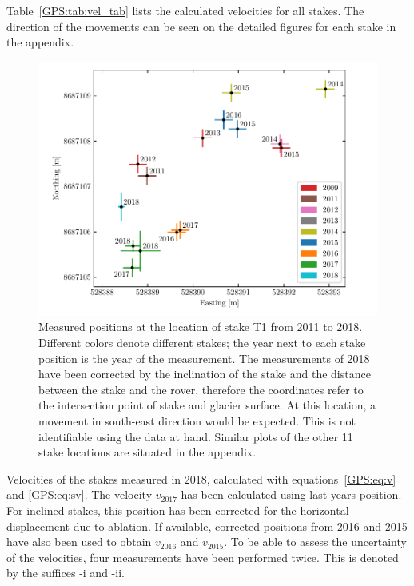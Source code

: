 Table~\ref{GPS:tab:vel_tab} lists the calculated velocities for all stakes.
The direction of the movements can be seen on the detailed figures for each stake in the appendix.


\begin{figure}[H]
    \centering
    \includegraphics[width=\textwidth]{./figs/T1_2d.pdf}
    \caption{Measured positions at the location of stake T1 from 2011 to 2018.
    Different colors denote different stakes;
  	the year next to each stake position is the year of the measurement.
  	The measurements of 2018 have been corrected by the inclination of the stake and
  	the distance between the stake and the rover, therefore the coordinates refer to the intersection point
  	of stake and glacier surface.
    	At this location, a movement in south-east direction would be expected.
    	This is not identifiable using the data at hand.
 	Similar plots of the other 11 stake locations are situated in the appendix.}
    \label{GPS:fig:T1_2d}
\end{figure}


\begin{table}[H]
	\caption{Velocities of the stakes measured in 2018, calculated with equations~\ref{GPS:eq:v} and \ref{GPS:eq:sv}.
	The velocity $v_{2017}$ has been calculated using last years position.
	For inclined stakes, this position has been corrected for the horizontal displacement due to ablation.
	If available, corrected positions from 2016 and 2015 have also been used to obtain $v_{2016}$ and $v_{2015}$.
	To be able to assess the uncertainty of the velocities, four measurements have been performed twice.
	This is denoted by the suffices -i and -ii.}
	\centering
	
	\label{GPS:tab:vel_tab}
\end{table}

